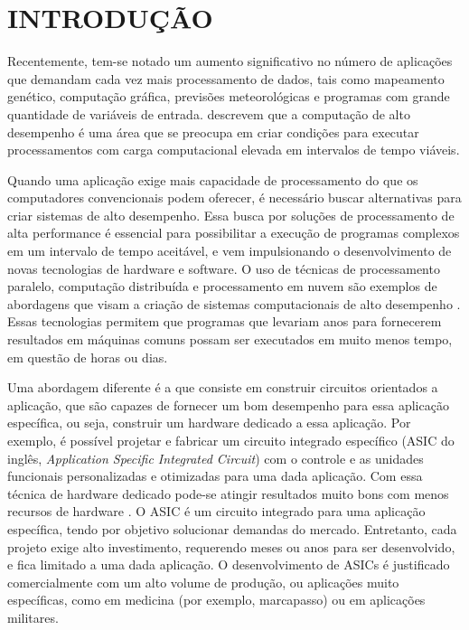 
\chapter{INTRODUÇÃO}\label{cap1}

Recentemente, tem-se notado um aumento significativo no número de aplicações que demandam cada vez mais processamento de dados, tais como mapeamento genético, computação gráfica, previsões meteorológicas e programas com grande quantidade de variáveis de entrada.  descrevem que a computação de alto desempenho é uma área que se preocupa em criar condições para executar processamentos com carga computacional elevada em intervalos de tempo viáveis.

Quando uma aplicação exige mais capacidade de processamento do que os computadores convencionais podem oferecer, é necessário buscar alternativas para criar sistemas de alto desempenho. Essa busca por soluções de processamento de alta performance é essencial para possibilitar a execução de programas complexos em um intervalo de tempo aceitável, e vem impulsionando o desenvolvimento de novas tecnologias de hardware e software. O uso de técnicas de processamento paralelo, computação distribuída e processamento em nuvem são exemplos de abordagens que visam a criação de sistemas computacionais de alto desempenho \cite{dowd2010high}. Essas tecnologias permitem que programas que levariam anos para fornecerem resultados em máquinas comuns possam ser executados em muito menos tempo, em questão de horas ou dias.

Uma abordagem diferente é a que consiste em construir circuitos orientados a aplicação, que são capazes de fornecer um bom desempenho para essa aplicação específica, ou seja, construir um hardware dedicado a essa aplicação. Por exemplo, é possível projetar e fabricar um circuito integrado específico (ASIC do inglês, \textit{Application Specific Integrated Circuit}) com o controle e as unidades funcionais personalizadas e otimizadas para uma dada aplicação. Com essa técnica de hardware dedicado pode-se atingir resultados muito bons com menos recursos de hardware \cite{Hager2017}. O ASIC é um circuito integrado para uma aplicação específica, tendo por objetivo solucionar demandas do mercado. Entretanto, cada projeto exige alto investimento, requerendo meses ou anos para ser desenvolvido, e fica limitado a uma dada aplicação. O desenvolvimento de ASICs é justificado comercialmente com um alto volume de produção, ou aplicações muito específicas, como em medicina (por exemplo, marcapasso) ou em aplicações militares.

